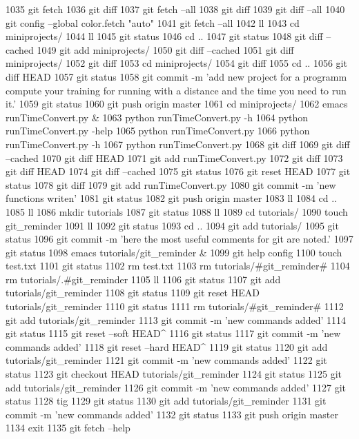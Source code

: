  1035  git fetch
 1036  git diff
 1037  git fetch --all
 1038  git diff
 1039  git diff --all
 1040  git config --global color.fetch "auto"
 1041  git fetch --all
 1042  ll
 1043  cd miniprojects/
 1044  ll
 1045  git status
 1046  cd ..
 1047  git status
 1048  git diff --cached
 1049  git add miniprojects/
 1050  git diff --cached
 1051  git diff miniprojects/
 1052  git diff
 1053  cd miniprojects/
 1054  git diff
 1055  cd ..
 1056  git diff HEAD
 1057  git status
 1058  git commit -m 'add new project for a programm compute your training for running with a distance and the time you need to run it.'
 1059  git status
 1060  git push origin master
 1061  cd miniprojects/
 1062  emacs runTimeConvert.py &
 1063  python runTimeConvert.py -h
 1064  python runTimeConvert.py -help
 1065  python runTimeConvert.py
 1066  python runTimeConvert.py -h
 1067  python runTimeConvert.py
 1068  git diff
 1069  git diff --cached
 1070  git diff HEAD
 1071  git add runTimeConvert.py
 1072  git diff
 1073  git diff HEAD
 1074  git diff --cached
 1075  git status
 1076  git reset HEAD
 1077  git status
 1078  git diff
 1079  git add runTimeConvert.py
 1080  git commit -m 'new functions writen'
 1081  git status
 1082  git push origin master
 1083  ll
 1084  cd ..
 1085  ll
 1086  mkdir tutorials
 1087  git status
 1088  ll
 1089  cd tutorials/
 1090  touch git_reminder
 1091  ll
 1092  git status
 1093  cd ..
 1094  git add tutorials/
 1095  git status
 1096  git commit -m 'here the most useful comments for git are noted.'
 1097  git status
 1098  emacs tutorials/git_reminder &
 1099  git help config
 1100  touch test.txt
 1101  git status
 1102  rm test.txt 
 1103  rm tutorials/#git_reminder# 
 1104  rm tutorials/.#git_reminder 
 1105  ll
 1106  git status
 1107  git add tutorials/git_reminder
 1108  git status
 1109  git reset HEAD tutorials/git_reminder
 1110  git status
 1111  rm tutorials/#git_reminder# 
 1112  git add tutorials/git_reminder
 1113  git commit -m 'new commands added'
 1114  git status
 1115  git reset --soft HEAD^
 1116  git status
 1117  git commit -m 'new commands added'
 1118  git reset --hard HEAD^
 1119  git status
 1120  git add tutorials/git_reminder
 1121  git commit -m 'new commands added'
 1122  git status
 1123  git checkout HEAD tutorials/git_reminder
 1124  git status
 1125  git add tutorials/git_reminder
 1126  git commit -m 'new commands added'
 1127  git status
 1128  tig
 1129  git status
 1130  git add tutorials/git_reminder
 1131  git commit -m 'new commands added'
 1132  git status
 1133  git push origin master
 1134  exit
 1135  git fetch --help
